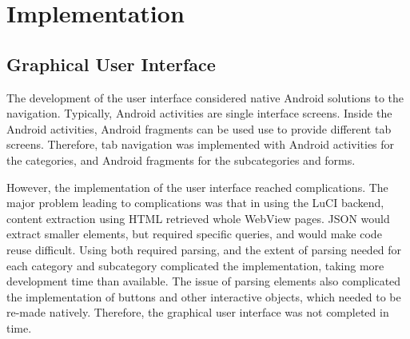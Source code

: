 \section{Implementation}
\subsection{Graphical User Interface}
The development of the user interface considered native Android solutions to the navigation. Typically, Android activities are single interface screens. Inside the Android activities, Android fragments can be used use to provide different tab screens. Therefore, tab navigation was implemented with Android activities for the categories, and Android fragments for the subcategories and forms.

However, the implementation of the user interface reached complications. The major problem leading to complications was that in using the LuCI backend, content extraction using HTML retrieved whole WebView pages. JSON would extract smaller elements, but required specific queries, and would make code reuse difficult. Using both required parsing, and the extent of parsing needed for each category and subcategory complicated the implementation, taking more development time than available. The issue of parsing elements also complicated the implementation of buttons and other interactive objects, which needed to be re-made natively. Therefore, the graphical user interface was not completed in time.